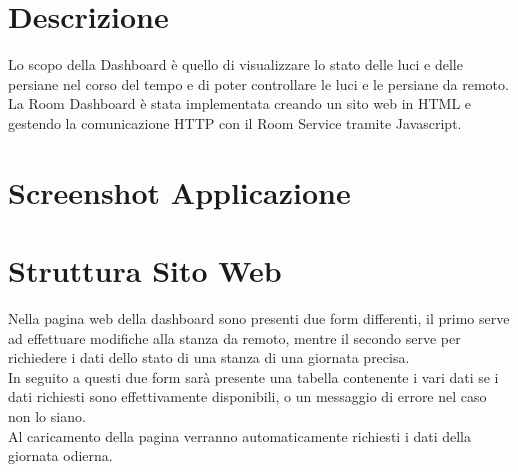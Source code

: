 \documentclass[a4paper]{report}
\begin{document}
\section{Descrizione}
Lo scopo della Dashboard è quello di visualizzare lo stato delle luci e delle persiane nel corso del tempo e di poter controllare le luci e le persiane da remoto.
La Room Dashboard è stata implementata creando un sito web in HTML e gestendo la comunicazione HTTP con il Room Service tramite Javascript.
\vspace{2cm}
\section{Screenshot Applicazione}


\begin{center}
\end{center}

\newpage

\section{Struttura Sito Web}
Nella pagina web della dashboard sono presenti due form differenti, il primo serve ad effettuare modifiche alla stanza da remoto, mentre il secondo serve per richiedere i dati dello stato di una stanza di una giornata precisa.\\
In seguito a questi due form sarà presente una tabella contenente i vari dati se i dati richiesti sono effettivamente disponibili, o un messaggio di errore nel caso non lo siano.\\
Al caricamento della pagina verranno automaticamente richiesti i dati della giornata odierna.

\vspace{2cm}
\end{document}
